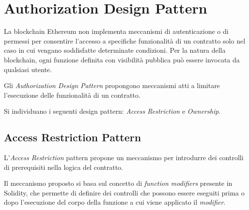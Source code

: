 {\section{Authorization Design Pattern}
La blockchain Ethereum non implementa meccanismi di autenticazione o di permessi per consentire l'accesso a specifiche funzionalità di un contratto solo nel caso in cui vengano soddisfatte determinate condizioni. Per la natura della blockchain, ogni funzione definita con visibilità pubblica può essere invocata da qualsiasi utente.\par
Gli \textit{Authorization Design Pattern} propongono meccanismi atti a limitare l'esecuzione delle funzionalità di un contratto.\par
Si individuano i seguenti design pattern: \textit{Access Restriction} e \textit{Ownership}.
{\subsection{Access Restriction Pattern}
	L'\textit{Access Restriction} pattern propone un meccanismo per introdurre dei controlli di prerequisiti nella logica del contratto.\par
	Il meccanismo proposto si basa sul concetto di \textit{function modifiers} presente in Solidity, che permette di definire dei controlli che possono essere eseguiti prima o dopo l'esecuzione del corpo della funzione a cui viene applicato il \textit{modifier}.
	\begin{table}[H]
		\centering
\end{table}}}

